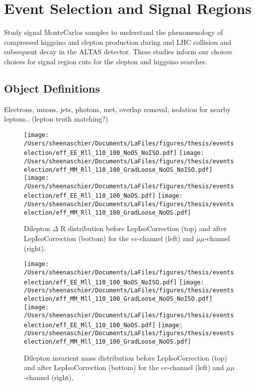 \chapter{Event Selection and Signal Regions}
Study signal MonteCarlos samples to understand the phenomenology of compressed higgsino and slepton production during and LHC collision and subsequent decay in the ALTAS detector.  These studies inform our choices choices for signal region cuts for the slepton and higgsino searches. 
\section{Object Definitions}
\label{sec:objdef}
Electrons, muons, jets, photons, met, overlap removal, isolation for nearby leptons.. (lepton truth matching?)

  \begin{figure}[tbp]
     \texttt{[image: /Users/sheenaschier/Documents/LaFiles/figures/thesis/eventselection/eff\_EE\_Rll\_110\_100\_NoOS\_NoISO.pdf]}
       \texttt{[image: /Users/sheenaschier/Documents/LaFiles/figures/thesis/eventselection/eff\_MM\_Rll\_110\_100\_GradLoose\_NoOS\_NoISO.pdf]}\\
     \texttt{[image: /Users/sheenaschier/Documents/LaFiles/figures/thesis/eventselection/eff\_EE\_Rll\_110\_100\_NoOS.pdf]}
     \texttt{[image: /Users/sheenaschier/Documents/LaFiles/figures/thesis/eventselection/eff\_MM\_Rll\_110\_100\_GradLoose\_NoOS.pdf]}\\
   \caption{Dilepton $\Delta$ R distribution before LepIsoCorrection (top) and after LepIsoCorrection (bottom) for the $ee$-channel (left) and $\mu\mu$-channel (right).}
   \label{fig:EffRll_ISOCorr}
 \end{figure}

  \begin{figure}[tbp]
     \texttt{[image: /Users/sheenaschier/Documents/LaFiles/figures/thesis/eventselection/eff\_EE\_Mll\_110\_100\_NoOS\_NoISO.pdf]}
       \texttt{[image: /Users/sheenaschier/Documents/LaFiles/figures/thesis/eventselection/eff\_MM\_Mll\_110\_100\_GradLoose\_NoOS\_NoISO.pdf]}\\
     \texttt{[image: /Users/sheenaschier/Documents/LaFiles/figures/thesis/eventselection/eff\_EE\_Mll\_110\_100\_NoOS.pdf]}
     \texttt{[image: /Users/sheenaschier/Documents/LaFiles/figures/thesis/eventselection/eff\_MM\_Mll\_110\_100\_GradLoose\_NoOS.pdf]}\\
   \caption{Dilepton invarient mass distribution before LepIsoCorrection (top) and after LepIsoCorrection (bottom) for the $ee$-channel (left) and $\mu\mu$-channel (right).}
   \label{fig:EffMll_ISOCorr}
 \end{figure}

